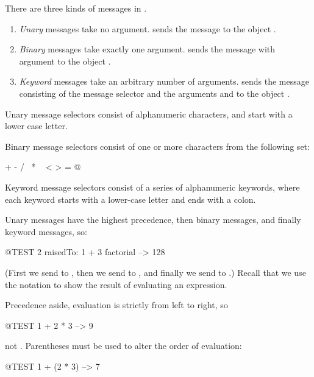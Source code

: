 \documentclass[a4paper,10pt,twoside]{book}
\begin{document}
There are three kinds of messages in \sq.
\begin{enumerate}
  \item \emph{Unary} messages take no argument.
   sends the message  to the object .
  \item \emph{Binary} messages take exactly one argument.
  	 sends the message \ct{+} with argument  to the object .
  \item \emph{Keyword} messages take an arbitrary number of arguments.
  	 sends the message consisting of the message selector
	 and the arguments  and  to the object .
\end{enumerate}

Unary message selectors consist of alphanumeric characters, and start with a lower case letter.

Binary message selectors consist of one or more characters from the following set:
\begin{code}{}
+ - / \ * ~ < > = @ %
\end{code}
\noindent
Keyword message selectors consist of a series of alphanumeric keywords, where each keyword starts with a lower-case letter and ends with a colon.

Unary messages have the highest precedence, then binary messages, and finally keyword messages, so:
\begin{code}{@TEST}
2 raisedTo: 1 + 3 factorial --> 128
\end{code}
(First we send  to , then we send  to , and finally we send  to .)  
Recall that we use the notation \ct{-->} to show the result of evaluating an expression.

Precedence aside, evaluation is strictly from left to right, so
\begin{code}{@TEST}
1 + 2 * 3 --> 9
\end{code}
not .
Parentheses must be used to alter the order of evaluation:
\begin{code}{@TEST}
1 + (2 * 3) --> 7
\end{code}
\end{document}
